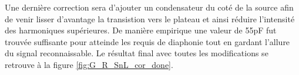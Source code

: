 Une dernière correction sera d'ajouter un condensateur du coté de la source afin de venir lisser d'avantage la transistion vers le plateau et ainsi réduire l'intensité des harmoniques supérieures. De manière empirique une valeur de 55pF fut trouvée suffisante pour atteinde les requis de diaphonie tout en gardant l'allure du signal reconnaissable. Le résultat final avec toutes les modifications se retrouve à la figure \ref{fig:G_R_SnL_cor_done}.

\vspace{0.3cm}
\vspace{0.3cm}
